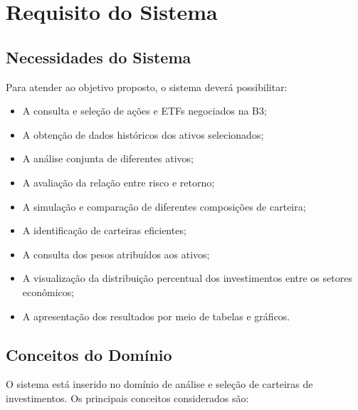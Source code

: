 \section{Requisito do Sistema}


\subsection{Necessidades do Sistema}

Para atender ao objetivo proposto, o sistema deverá possibilitar:

\begin{itemize}
    \item A consulta e seleção de ações e ETFs negociados na B3;

    \item A obtenção de dados históricos dos ativos selecionados;

    \item A análise conjunta de diferentes ativos;

    \item A avaliação da relação entre risco e retorno;

    \item A simulação e comparação de diferentes composições
    de carteira;

    \item A identificação de carteiras eficientes;

    \item A consulta dos pesos atribuídos aos ativos;

    \item A visualização da distribuição percentual dos
    investimentos entre os setores econômicos;

    \item A apresentação dos resultados por meio de tabelas
    e gráficos.
\end{itemize}

\subsection{Conceitos do Domínio}

O sistema está inserido no domínio de análise e seleção de
carteiras de investimentos. Os principais conceitos considerados
são:

